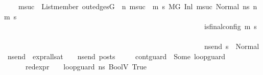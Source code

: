 \begin{isabellebody}
\ \ \ \ {\isacharparenleft}{\kern0pt}{\isasymforall}msuc{}{\isachardot}{\kern0pt}\ \ List{\isachardot}{\kern0pt}member\ {\isacharparenleft}{\kern0pt}out{\isacharunderscore}{\kern0pt}edges{\isacharparenleft}{\kern0pt}G{\isacharparenright}{\kern0pt}\ {\isacharbang}{\kern0pt}\ n{\isacharparenright}{\kern0pt}\ msuc{}\ {\isasymlongrightarrow}\ {\isacharparenleft}{\kern0pt}{\isasymforall}m{\isacharprime}{\kern0pt}\ s{\isacharprime}{\kern0pt}{\isachardot}{\kern0pt}\ {\isacharparenleft}{\kern0pt}{\isacharparenleft}{\kern0pt}M{\isacharcomma}{\kern0pt}{\isasymLambda}{\isacharcomma}{\kern0pt}{\isasymGamma}{\isacharcomma}{\kern0pt}{\isasymOmega}{\isacharcomma}{\kern0pt}G\ {\isasymturnstile}{\isacharparenleft}{\kern0pt}Inl\ {\isacharparenleft}{\kern0pt}msuc{}{\isacharparenright}{\kern0pt}{\isacharcomma}{\kern0pt}\ Normal\ ns{}{\isacharprime}{\kern0pt}{\isacharprime}{\kern0pt}{\isacharparenright}{\kern0pt}\ {\isacharminus}{\kern0pt}n{\isasymrightarrow}{\isacharasterisk}{\kern0pt}\ {\isacharparenleft}{\kern0pt}m{\isacharprime}{\kern0pt}{\isacharcomma}{\kern0pt}\ s{\isacharprime}{\kern0pt}{\isacharparenright}{\kern0pt}{\isacharparenright}{\kern0pt}\ {\isasymlongrightarrow}\isanewline
\ \ \ \ \ \ \ \ \ \ \ \ \ \ \ \ \ \ \ \ \ \ \ \ \ \ \ \ \ \ \ \ \ \ \ \ \ \ \ \ \ \ \ \ \ \ \ \ \ \ \ \ \ \ \ \ is{\isacharunderscore}{\kern0pt}final{\isacharunderscore}{\kern0pt}config\ {\isacharparenleft}{\kern0pt}m{\isacharprime}{\kern0pt}{\isacharcomma}{\kern0pt}\ s{\isacharprime}{\kern0pt}{\isacharparenright}{\kern0pt}\ {\isasymlongrightarrow}\ \isanewline
\ \ \ \ \ \ \ \ \ \ \ \ \ \ \ \ \ \ \ \ \ \ \ \ \ \ \ \ \ \ \ \ \ \ \ \ \ \ \ \ \ \ \ \ \ \ \ \ \ \ \ \ \ \ \ \ {\isacharparenleft}{\kern0pt}{\isasymforall}ns{\isacharunderscore}{\kern0pt}end{\isachardot}{\kern0pt}\ s{\isacharprime}{\kern0pt}\ {\isacharequal}{\kern0pt}\ Normal\ ns{\isacharunderscore}{\kern0pt}end\ {\isasymlongrightarrow}\ {\isacharparenleft}{\kern0pt}expr{\isacharunderscore}{\kern0pt}all{\isacharunderscore}{\kern0pt}sat\ {\isasymLambda}\ {\isasymGamma}\ {\isasymOmega}\ ns{\isacharunderscore}{\kern0pt}end{\isacharparenright}{\kern0pt}\ posts{\isacharparenright}{\kern0pt}{\isacharparenright}{\kern0pt}{\isacharparenright}{\kern0pt}{\isacharparenright}{\kern0pt}\ {\isasymLongrightarrow}\isanewline
\ \ \ \ {\isacharparenleft}{\kern0pt}{\isacharparenleft}{\kern0pt}cont{\isacharunderscore}{\kern0pt}guard\ {\isacharequal}{\kern0pt}\ Some\ loop{\isacharunderscore}{\kern0pt}guard{\isacharparenright}{\kern0pt}\ {\isasymand}\ \isanewline
\ \ \ \ \ \ {\isacharparenleft}{\kern0pt}red{\isacharunderscore}{\kern0pt}expr\ {\isasymLambda}\ {\isasymGamma}\ {\isasymOmega}\ loop{\isacharunderscore}{\kern0pt}guard\ ns{}{\isacharprime}{\kern0pt}{\isacharprime}{\kern0pt}\ {\isacharparenleft}{\kern0pt}BoolV\ True{\isacharparenright}{\kern0pt}{\isacharparenright}{\kern0pt}\ {\isasymand}\ \isanewline

\end{isabellebody}
